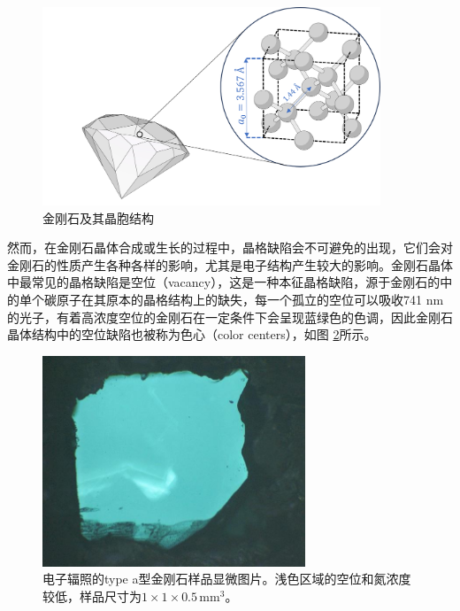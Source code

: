 \documentclass[type = bachelor]{whu-thesis}
\begin{document}
\begin{figure}[h]
  \centering
  \includegraphics[width=0.9\textwidth]{figures/Chapter 1/Diamond Lattice.png}
  \caption[金刚石及其晶胞结构]{金刚石及其晶胞结构}
  \label{fig: Diamond Lattice}
\end{figure}

然而，在金刚石晶体合成或生长的过程中，晶格缺陷会不可避免的出现，它们会对金刚石的性质产生各种各样的影响，尤其是电子结构产生较大的影响\cite{jelezko2006single, nebel2003electronic}。金刚石晶体中最常见的晶格缺陷是空位（vacancy），这是一种本征晶格缺陷，源于金刚石的中的单个碳原子在其原本的晶格结构上的缺失，每一个孤立的空位可以吸收741 nm的光子，有着高浓度空位的金刚石在一定条件下会呈现蓝绿色的色调，因此金刚石晶体结构中的空位缺陷也被称为色心（color centers），如图 \ref{fig: Color Center}所示\cite{waldermann2007creating, kiflawi2007electron}。

\begin{figure}
  \centering
  \includegraphics[width=0.7\textwidth]{figures/Chapter 1/Color Center.jpg}
  \caption[电子辐照的type \uppercase\expandafter{}a型金刚石样品显微图片]{电子辐照的type \uppercase\expandafter{}a型金刚石样品显微图片。浅色区域的空位和氮浓度较低，样品尺寸为\(1\times1\times0.5 \, \mathrm{mm^3}\)。}
  \label{fig: Color Center}
\end{figure}
\end{document}
